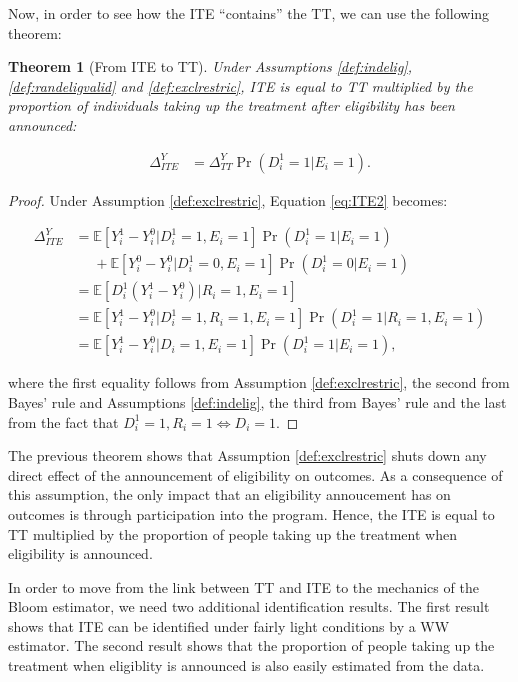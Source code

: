 \documentclass[
]{book}
\newcommand{\esp}[1]{\mathbb{E}[ #1 ]}
\newtheorem{theorem}{Theorem}[chapter]
\theoremstyle{definition}
\theoremstyle{definition}
\theoremstyle{definition}
\theoremstyle{definition}
\theoremstyle{remark}
\begin{document}
Now, in order to see how the ITE ``contains'' the TT, we can use the following theorem:

\begin{theorem}[From ITE to TT]
\protect\hypertarget{thm:ITETT}{}{\label{thm:ITETT} \iffalse (From ITE to TT) \fi{} }Under Assumptions \ref{def:indelig}, \ref{def:randeligvalid} and \ref{def:exclrestric}, ITE is equal to TT multiplied by the proportion of individuals taking up the treatment after eligibility has been announced:

\begin{align*}
  \Delta^Y_{ITE} & = \Delta^Y_{TT}\Pr(D^1_i=1|E_i=1).
\end{align*}
\end{theorem}

\begin{proof}
\iffalse{} {Proof. } \fi{}Under Assumption \ref{def:exclrestric}, Equation \eqref{eq:ITE2} becomes:

\begin{align*}
  \Delta^Y_{ITE} & = \esp{Y_i^{1}-Y_i^{0}|D^1_i=1,E_i=1}\Pr(D^1_i=1|E_i=1) \\
                & \phantom{=}+\esp{Y_i^{0}-Y_i^{0}|D_i^1=0,E_i=1}\Pr(D_i^1=0|E_i=1)\\
                & = \esp{D_i^1(Y_i^{1}-Y_i^{0})|R_i=1,E_i=1} \\
                & = \esp{Y_i^{1}-Y_i^{0}|D_i^1=1,R_i=1,E_i=1}\Pr(D^1_i=1|R_i=1,E_i=1) \\
                & = \esp{Y_i^{1}-Y_i^{0}|D_i=1,E_i=1}\Pr(D^1_i=1|E_i=1),
\end{align*}

where the first equality follows from Assumption \ref{def:exclrestric}, the second from Bayes' rule and Assumptions \ref{def:indelig}, the third from Bayes' rule and the last from the fact that \(D_i^1=1,R_i=1\Leftrightarrow D_i=1\).
\end{proof}

The previous theorem shows that Assumption \ref{def:exclrestric} shuts down any direct effect of the announcement of eligibility on outcomes.
As a consequence of this assumption, the only impact that an eligibility annoucement has on outcomes is through participation into the program.
Hence, the ITE is equal to TT multiplied by the proportion of people taking up the treatment when eligibility is announced.

In order to move from the link between TT and ITE to the mechanics of the Bloom estimator, we need two additional identification results.
The first result shows that ITE can be identified under fairly light conditions by a WW estimator.
The second result shows that the proportion of people taking up the treatment when eligiblity is announced is also easily estimated from the data.
\end{document}
